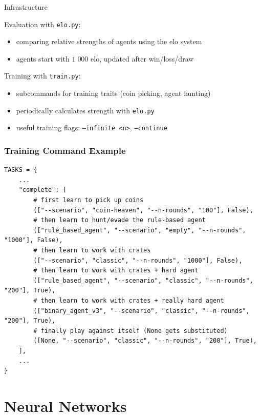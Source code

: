 \documentclass{beamer}
\begin{document}
\begin{frame}{Infrastructure}
	\pause

	Evaluation with \texttt{elo.py}:
	\begin{itemize}
		\item comparing relative strengths of agents using the elo system
		\item agents start with $1\;000$ elo, updated after win/loss/draw
	\end{itemize}

	\vspace{1.2em}
	\pause

	Training with \texttt{train.py}:
	\begin{itemize}
		\item subcommands for training traits (coin picking, agent hunting)
		\item periodically calculates strength with \texttt{elo.py}
		\item useful training flags: \texttt{--infinite <n>}, \texttt{--continue}
	\end{itemize}
\end{frame}

\begin{frame}[fragile]
	\frametitle{Training Command Example}
	\pause

\fontsize{7}{9}
\begin{verbatim}
TASKS = {
    ...
    "complete": [
        # first learn to pick up coins
        (["--scenario", "coin-heaven", "--n-rounds", "100"], False),
        # then learn to hunt/evade the rule-based agent
        (["rule_based_agent", "--scenario", "empty", "--n-rounds", "1000"], False),
        # then learn to work with crates
        (["--scenario", "classic", "--n-rounds", "1000"], False),
        # then learn to work with crates + hard agent
        (["rule_based_agent", "--scenario", "classic", "--n-rounds", "200"], True),
        # then learn to work with crates + really hard agent
        (["binary_agent_v3", "--scenario", "classic", "--n-rounds", "200"], True),
        # finally play against itself (None gets substituted)
        ([None, "--scenario", "classic", "--n-rounds", "200"], True),
    ],
    ...
}
\end{verbatim}
\end{frame}

\section{Neural Networks}
\end{document}
